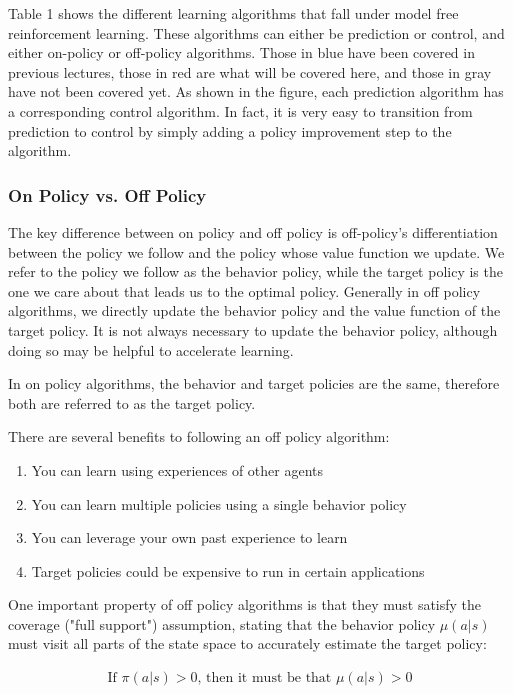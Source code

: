\documentclass[11pt]{article}
\begin{document}
Table 1 shows the different learning algorithms that fall under model free reinforcement learning. These algorithms can either be prediction or control, and either on-policy or off-policy algorithms. Those in blue have been covered in previous lectures, those in red are what will be covered here, and those in gray have not been covered yet. As shown in the figure, each prediction algorithm has a corresponding control algorithm. In fact, it is very easy to transition from prediction to control by simply adding a policy improvement step to the algorithm.

\subsubsection{On Policy vs. Off Policy}

The key difference between on policy and off policy is off-policy's differentiation between the policy we follow and the policy whose value function we update. We refer to the policy we follow as the behavior policy, while the target policy is the one we care about that leads us to the optimal policy. Generally in off policy algorithms, we directly update the behavior policy and the value function of the target policy. It is not always necessary to update the behavior policy, although doing so may be helpful to accelerate learning.

In on policy algorithms, the behavior and target policies are the same, therefore both are referred to as the target policy.

There are several benefits to following an off policy algorithm:
\begin{enumerate}
    \item You can learn using experiences of other agents
    \item You can learn multiple policies using a single behavior policy
    \item You can leverage your own past experience to learn
    \item Target policies could be expensive to run in certain applications
\end{enumerate}

One important property of off policy algorithms is that they must satisfy the coverage ("full support") assumption, stating that the behavior policy $\mu(a|s)$ must visit all parts of the state space to accurately estimate the target policy:

\begin{align}
\label{eq:2}
    \text{If } \pi(a|s) > 0\text{, then it must be that }\mu(a|s) > 0
\end{align}
\end{document}

